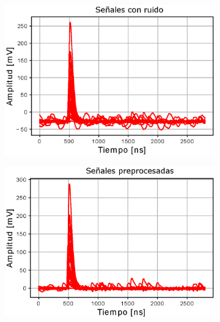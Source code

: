 \begin{figure}[h!]
     \centering
        \caption{Pulsos de voltaje de un SiPM antes y después del preprocesamiento para filtrar ruido por interferencias electromagnéticas y eliminar el \textit{offset}.}
     \begin{subfigure}[b]{0.48\textwidth}
         \centering
         \includegraphics[width=\textwidth]{Images/Pulse_noise.eps}
         \label{fig:PulsesNoise1}
     \end{subfigure}
     \begin{subfigure}[b]{0.48\textwidth}
         \centering
         \includegraphics[width=\textwidth]{Images/Pulse_filter.eps}
         \label{fig:PulsesNoise2}
     \end{subfigure}
        \label{fig:PulsesNoise}
\end{figure}
